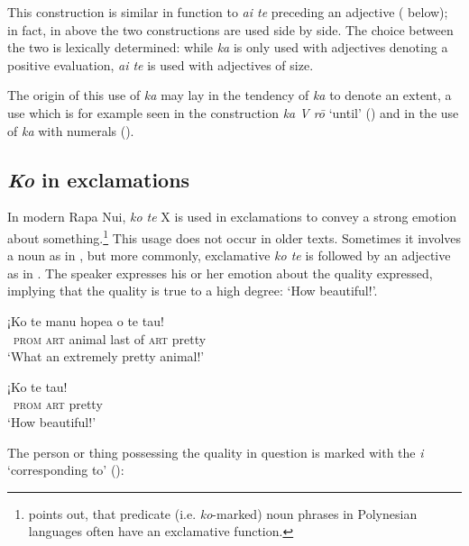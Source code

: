 This construction is similar in function to \textit{{\ꞌ}ai te} preceding an adjective ( below); in fact, in  above the two constructions are used side by side. The choice between the two is lexically determined: while \textit{ka} is only used with adjectives denoting a positive evaluation, \textit{{\ꞌ}ai te} is used with adjectives of size. 

The origin of this use of \textit{ka} may lay in the tendency of \textit{ka} to denote an extent, a use which is for example seen in the construction \textit{ka V rō} ‘until’ () and in the use of \textit{ka} with numerals ().

\subsection{\textit{Ko} in exclamations}\label{sec:10.4.2}

In modern Rapa Nui, \textit{ko te} X is used in exclamations to convey a strong emotion about something.\footnote{\label{fn:491}\citet[149]{Moyse-Faurie2011} points out, that predicate (i.e. \textit{ko}{}-marked) noun phrases in Polynesian languages often have an exclamative function.} This usage does not occur in older texts. Sometimes it involves a noun as in , but more commonly, exclamative \textit{ko te} is followed by an adjective as in . The speaker expresses his or her emotion about the quality expressed, implying that the quality is true to a high degree: ‘How beautiful!’.

\ea\label{ex:10.80}
\gll ¡Ko te manu hope{\ꞌ}a o te tau! \\
~\textsc{prom} \textsc{art} animal last of \textsc{art} pretty \\

\glt 
‘What an extremely pretty animal!’ \textstyleExampleref{[R345.072]} 
\z

\ea\label{ex:10.81}
\gll ¡Ko te tau! \\
~\textsc{prom} \textsc{art} pretty \\

\glt
‘How beautiful!’ \textstyleExampleref{[R412.384]} 
\z

The person or thing possessing the quality in question is marked with the  \textit{i} ‘corresponding to’ ():

